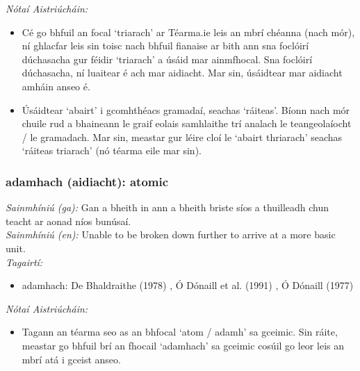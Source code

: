 \documentclass{article}
\begin{document}
 \noindent \textit{Nótaí Aistriúcháin:}
\begin{itemize}
	\item Cé go bhfuil an focal `triarach' ar Téarma.ie leis an mbrí chéanna (nach mór), ní ghlacfar leis sin toisc nach bhfuil fianaise ar bith ann sna foclóirí dúchasacha gur féidir `triarach' a úsáid mar ainmfhocal. Sna foclóirí dúchasacha, ní luaitear é ach mar aidiacht. Mar sin, úsáidtear mar aidiacht amháin anseo é.
	\item Úsáidtear `abairt' i gcomhthéacs gramadaí, seachas `ráiteas'. Bíonn nach mór chuile rud a bhaineann le graif eolais samhlaithe trí analach le teangeolaíocht / le gramadach. Mar sin, meastar gur léire cloí le `abairt thriarach' seachas `ráiteas triarach' (nó téarma eile mar sin).
\end{itemize}


\subsubsection*{adamhach (aidiacht): atomic}
 \noindent \textit{Sainmhíniú (ga):} Gan a bheith in ann a bheith briste síos a thuilleadh chun teacht ar aonad níos bunúsaí.
\\
 \noindent \textit{Sainmhíniú (en):} Unable to be broken down further to arrive at a more basic unit.
\\
 \noindent \textit{Tagairtí:}
\begin{itemize}
	\item adamhach: De Bhaldraithe (1978) \cite{de-bhaldraithe}, Ó Dónaill et al. (1991) \cite{focloir-beag}, Ó Dónaill (1977) \cite{odonaill}
\end{itemize}

 \noindent \textit{Nótaí Aistriúcháin:}
\begin{itemize}
	\item Tagann an téarma seo as an bhfocal `atom / adamh' sa gceimic. Sin ráite, meastar go bhfuil brí an fhocail `adamhach' sa gceimic cosúil go leor leis an mbrí atá i gceist anseo.
\end{itemize}
\end{document}
